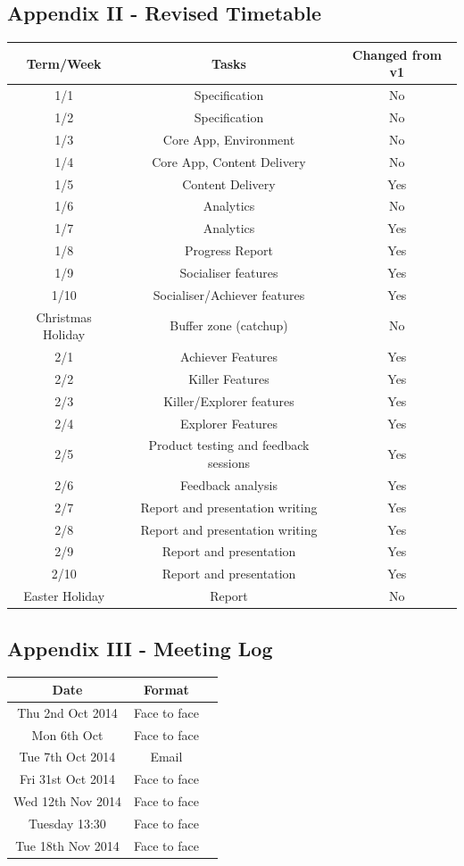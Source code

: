 \documentclass[10pt,a4paper]{report}
\begin{document}
\subsection*{Appendix II - Revised Timetable}
\begin{tabular}{|c|c|c|}
	\hline Term/Week & Tasks & Changed from v1 \\ 
	\hline 1/1 & Specification & No \\ 
	\hline 1/2 & Specification & No \\ 
	\hline 1/3 & Core App, Environment & No \\ 
	\hline 1/4 & Core App, Content Delivery & No \\
	\hline 1/5 & Content Delivery & Yes \\
	\hline 1/6 & Analytics & No \\ 
	\hline 1/7 & Analytics & Yes \\
	\hline 1/8 & Progress Report & Yes \\
	\hline 1/9 & Socialiser features & Yes \\
	\hline 1/10 & Socialiser/Achiever features & Yes \\
	\hline Christmas Holiday & Buffer zone (catchup) & No \\
	\hline 2/1 & Achiever Features & Yes \\ 
	\hline 2/2 & Killer Features & Yes \\ 
	\hline 2/3 & Killer/Explorer features & Yes \\ 
	\hline 2/4 & Explorer Features & Yes \\ 
	\hline 2/5 & Product testing and feedback sessions & Yes \\ 
	\hline 2/6 & Feedback analysis & Yes \\ 
	\hline 2/7 & Report and presentation writing & Yes \\ 
	\hline 2/8 & Report and presentation writing & Yes \\ 
	\hline 2/9 & Report and presentation & Yes \\ 
	\hline 2/10 & Report and presentation & Yes \\
	\hline Easter Holiday & Report & No \\
	\hline 
\end{tabular}

\subsection*{Appendix III - Meeting Log}
\begin{tabular}{|c|c|c|}
	\hline Date & Format \\ 
	\hline Thu 2nd Oct 2014 & Face to face \\ 
	\hline Mon 6th Oct & Face to face \\
	\hline Tue 7th Oct 2014 & Email \\ 
	\hline Fri 31st Oct 2014 & Face to face \\ 
	\hline Wed 12th Nov 2014 & Face to face \\
	\hline Tuesday 13:30 & Face to face \\ 
	\hline Tue 18th Nov 2014 & Face to face \\ 
	\hline 
	\end{tabular} 
\end{document}
